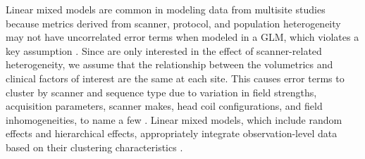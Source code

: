 Linear mixed models are common in modeling data from multisite studies because metrics derived from scanner, protocol, and population heterogeneity may not have uncorrelated error terms when modeled in a GLM, which violates a key assumption \cite{garson2013fundamentals}. Since are only interested in the effect of scanner-related heterogeneity, we assume that the relationship between the volumetrics and clinical factors of interest are the same at each site. This causes error terms to cluster by scanner and sequence type due to variation in field strengths, acquisition parameters, scanner makes, head coil configurations, and field inhomogeneities, to name a few \cite{cannon2014}. Linear mixed models, which include random effects and hierarchical effects, appropriately integrate observation-level data based on their clustering characteristics \cite{garson2013fundamentals}.